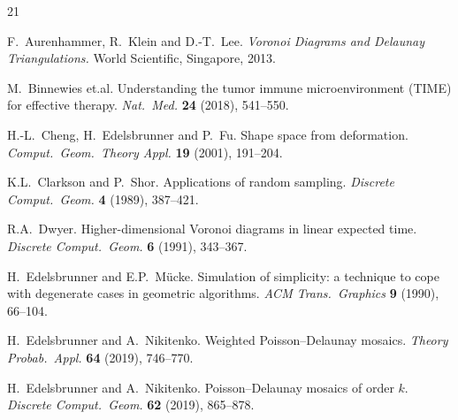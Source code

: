 \documentclass[a4paper]{article}
\theoremstyle{definition}
\numberwithin{theorem}{section}
\numberwithin{equation}{section}
\begin{document}
\begin{thebibliography}{21}

{\footnotesize

{\sc F.\ Aurenhammer, R.\ Klein and D.-T.\ Lee.}
\emph{Voronoi Diagrams and Delaunay Triangulations.}
World Scientific, Singapore, 2013.

{\sc M.\ Binnewies et.al.}
Understanding the tumor immune microenvironment (TIME) for effective therapy.
\emph{Nat.\ Med.} {\bf 24} (2018), 541--550.



{\sc H.-L.\ Cheng, H.\ Edelsbrunner and P.\ Fu.}
Shape space from deformation.
\emph{Comput.\ Geom.\ Theory Appl.} {\bf 19} (2001), 191--204.

{\sc K.L.\ Clarkson and P.\ Shor.}
Applications of random sampling.
\emph{Discrete Comput.\ Geom.} {\bf 4} (1989), 387--421.


{\sc R.A.\ Dwyer.}
Higher-dimensional Voronoi diagrams in linear expected time.
\emph{Discrete Comput.\ Geom.} {\bf 6} (1991), 343--367.
  

{\sc H.\ Edelsbrunner and E.P.\ M\"{u}cke.} Simulation of simplicity: a technique to cope with degenerate cases in geometric algorithms. \emph{ACM Trans.\ Graphics} {\bf 9} (1990), 66--104.
  
{\sc H.\ Edelsbrunner and A.\ Nikitenko.}
Weighted Poisson--Delaunay mosaics.
\emph{Theory Probab.\ Appl.} {\bf 64} (2019), 746--770.
  
{\sc H.\ Edelsbrunner and A.\ Nikitenko.}
Poisson--Delaunay mosaics of order $k$.
\emph{Discrete Comput.\ Geom.} {\bf 62} (2019), 865--878. 

}
\end{thebibliography}
\end{document}
